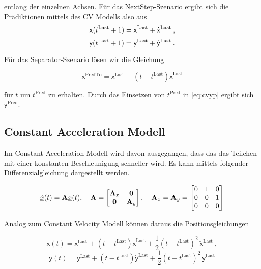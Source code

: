 entlang der einzelnen Achsen.
Für das NextStep-Szenario ergibt sich die Prädiktionen mittels des CV Modells also aus
\begin{equation*}
    \mathsf{x}(t{^{\text{Last}}}+1) = \mathsf{x}^{\text{Last}} + \dot{\mathsf{x}}^{\text{Last}} \: ,
\end{equation*}
\begin{equation}\label{eq:cvyp}
    \mathsf{y}(t{^{\text{Last}}}+1) = \mathsf{y}^{\text{Last}} + \dot{\mathsf{y}}^{\text{Last}} \: .
\end{equation}

Für das Separator-Szenario lösen wir die Gleichung 

\begin{equation*}
    \mathsf{x}^{\text{PredTo}} = \mathsf{x}^{\text{Last}} + (t - t^{\text{Last}})\dot{\mathsf{x}}^{\text{Last}}
\end{equation*}

für \(t\) um  \(t^{\text{Pred}}\) zu erhalten.
Durch das Einsetzen von \(t^{\text{Pred}}\) in \eqref{eq:cvyp} ergibt sich \(\mathsf{y}^{\text{Pred}}\).

\subsection{Constant Acceleration Modell}

Im Constant Acceleration Modell wird davon ausgegangen, dass das das Teilchen mit einer konstanten Beschleunigung schneller wird.
Es kann mittels folgender Differenzialgleichung dargestellt werden.

\begin{align*} \label{eq:speedCV}
    \dot{{\underline{x}}}(t) = {{\mathbf{A}}}{\underline{x}}(t), \quad {\ensuremath{{\mathbf{A}}}} = 
    \begin{bmatrix}
        {\ensuremath{{\mathbf{A}}}}_x & \boldsymbol{0} \\
        \boldsymbol{0} & {{\mathbf{A}}}_y
    \end{bmatrix} 
    , \quad
    {\ensuremath{{\mathbf{A}}}}_x = {{\mathbf{A}}}_y = 
    \begin{bmatrix}
        0 & 1 & 0 \\
        0 & 0 & 1 \\
        0 & 0 & 0
    \end{bmatrix} 
\end{align*}

Analog zum Constant Velocity Modell können daraus die Positionsgleichungen 

\begin{equation*}
    \mathsf{x}(t) = \mathsf{x}^{\text{Last}} + (t - t^{\text{Last}})\dot{\mathsf{x}}^{\text{Last}} 
    + \frac{1}{2} (t - t^{\text{Last}})^2 \: \ddot{\mathsf{x}}^{\text{Last}} \: , 
\end{equation*}
\begin{equation*}
    \mathsf{y}(t) = \mathsf{y}^{\text{Last}} + (t - t^{\text{Last}})\dot{\mathsf{y}}^{\text{Last}}
    + \frac{1}{2} (t - t^{\text{Last}})^2 \: \ddot{\mathsf{y}}^{\text{Last}}
\end{equation*}

